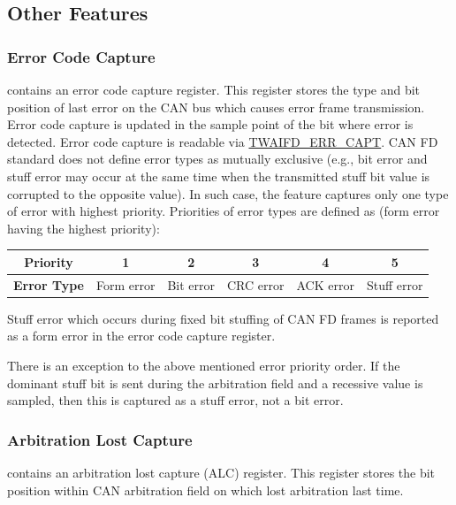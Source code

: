 \documentclass[main\_\_EN.tex]{subfiles}
\begin{document}
\subsection{Other Features}

\subsubsection{Error Code Capture}

\modulename{} contains an error code capture register. This register stores the type and bit position of last error on the CAN bus which causes error frame transmission. Error code capture is updated in the sample point of the bit where error is detected. Error code capture is readable via \hyperref[regdesc:TWAIFDERRCAPTRETRCTRALCTSINFOREG]{TWAIFD\_ERR\_CAPT}. CAN FD standard does not define error types as mutually exclusive (e.g., bit error and stuff error may occur at the same time when the transmitted stuff bit value is corrupted to the opposite value). In such case, the feature captures only one type of error with highest priority. Priorities of error types are defined as (form error having the highest priority):

\begin{center}
\begin{tabular}{|c|c|c|c|c|c|}
\hline
\textbf{Priority} \cellcolor{lightgray} & 1 & 2 & 3 & 4 & 5\tabularnewline
\hline
\textbf{Error Type} \cellcolor{lightgray} & Form error & Bit error & CRC error & ACK error & Stuff error\tabularnewline
\hline
\end{tabular}
\par\end{center}

Stuff error which occurs during fixed bit stuffing of CAN FD frames is reported as a form error in the error code capture register.

There is an exception to the above mentioned error priority order. If the dominant stuff bit is sent during the arbitration field and a recessive value is sampled, then this is captured as a stuff error, not a bit error.


\subsubsection{Arbitration Lost Capture}

\modulename{} contains an arbitration lost capture (ALC) register. This register stores the bit position within CAN arbitration field on which \modulename{} lost arbitration last time.
\end{document}
